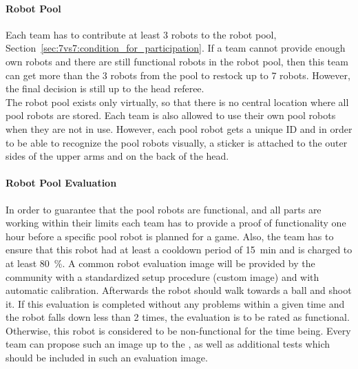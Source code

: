         \paragraph{Robot Pool}
            Each team has to contribute at least 3 robots to the robot pool, \cf Section~\ref{sec:7vs7:condition_for_participation}. If a team cannot provide enough own robots and there are still functional robots in the robot pool, then this team can get more than the 3 robots from the pool to restock up to 7 robots. However, the final decision is still up to the head referee. \\
            The robot pool exists only virtually, so that there is no central location where all pool robots are stored. Each team is also allowed to use their own pool robots when they are not in use. However, each pool robot gets a unique ID and in order to be able to recognize the pool robots visually, a sticker is attached to the outer sides of the upper arms and on the back of the head.

        \paragraph{Robot Pool Evaluation}
            In order to guarantee that the pool robots are functional, and all parts are working within their limits each team has to provide a proof of functionality one hour before a specific pool robot is planned for a game. Also, the team has to ensure that this robot had at least a cooldown period of \qty{15}{\minute} and is charged to at least \qty{80}{\percent}.
            A common robot evaluation image will be provided by the community with a standardized setup procedure (custom image) and with automatic calibration. Afterwards the robot should walk towards a ball and shoot it. If this evaluation is completed without any problems within a given time  and the robot falls down less than 2 times, the evaluation is to be rated as functional. Otherwise, this robot is considered to be non-functional for the time being. Every team can propose such an image up to the , as well as additional tests which should be included in such an evaluation image.

